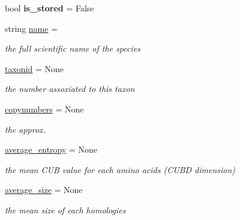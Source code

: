 \begin{DoxyCompactItemize}
\mbox{\label{class_py_c_u_b_1_1espece_1_1_espece_a8befee83c9b6ecfc8b07e66b6251afa4}} 
bool {\bfseries is\+\_\+stored} = False
\item 
string \mbox{\hyperlink{class_py_c_u_b_1_1espece_1_1_espece_a3a33da4c7b0c9163b8673166b306226c}{name}} = \textquotesingle{}\textquotesingle{}
\begin{DoxyCompactList}\small\item\em the full scientific name of the species \end{DoxyCompactList}\item 
\mbox{\label{class_py_c_u_b_1_1espece_1_1_espece_aae7cf0e3c6f359bd2970006817e80ed3}} 
\mbox{\hyperlink{class_py_c_u_b_1_1espece_1_1_espece_aae7cf0e3c6f359bd2970006817e80ed3}{taxonid}} = None
\begin{DoxyCompactList}\small\item\em the number assoxiated to this taxon \end{DoxyCompactList}\item 
\mbox{\hyperlink{class_py_c_u_b_1_1espece_1_1_espece_a89cd4e211bf028a4d141202e8a885b58}{copynumbers}} = None
\begin{DoxyCompactList}\small\item\em the approx. \end{DoxyCompactList}\item 
\mbox{\label{class_py_c_u_b_1_1espece_1_1_espece_a2dc4b3f0d2006aac69a9846ba834d209}} 
\mbox{\hyperlink{class_py_c_u_b_1_1espece_1_1_espece_a2dc4b3f0d2006aac69a9846ba834d209}{average\+\_\+entropy}} = None
\begin{DoxyCompactList}\small\item\em the mean C\+UB value for each amino acids (C\+U\+BD dimension) \end{DoxyCompactList}\item 
\mbox{\label{class_py_c_u_b_1_1espece_1_1_espece_a2991e13a2c75e2e899f3f8f773d1d9b6}} 
\mbox{\hyperlink{class_py_c_u_b_1_1espece_1_1_espece_a2991e13a2c75e2e899f3f8f773d1d9b6}{average\+\_\+size}} = None
\begin{DoxyCompactList}\small\item\em the mean size of each homologies \end{DoxyCompactList}\item 

\end{DoxyCompactItemize}
